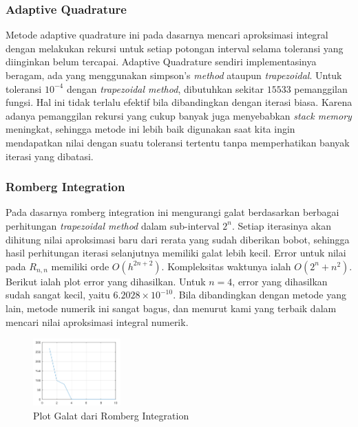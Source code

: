 \documentclass[11pt, a4paper, onecolumn, oneside, final]{report}
\begin{document}
\subsubsection*{Adaptive Quadrature}

Metode adaptive quadrature ini pada dasarnya mencari aproksimasi integral dengan melakukan rekursi untuk setiap potongan interval selama toleransi yang diinginkan belum tercapai. Adaptive Quadrature sendiri implementasinya beragam, ada yang menggunakan simpson's \textit{method} ataupun \textit{trapezoidal}. Untuk toleransi $10^{-4}$ dengan \textit{trapezoidal method}, dibutuhkan sekitar $15533$ pemanggilan fungsi. Hal ini tidak terlalu efektif bila dibandingkan dengan iterasi biasa. Karena adanya pemanggilan rekursi yang cukup banyak juga menyebabkan \textit{stack memory} meningkat, sehingga metode ini lebih baik digunakan saat kita ingin mendapatkan nilai dengan suatu toleransi tertentu tanpa memperhatikan banyak iterasi yang dibatasi.

\subsubsection*{Romberg Integration}

Pada dasarnya romberg integration ini mengurangi galat berdasarkan berbagai perhitungan \textit{trapezoidal method} dalam sub-interval $2^n$. Setiap iterasinya akan dihitung nilai aproksimasi baru dari rerata yang sudah diberikan bobot, sehingga hasil perhitungan iterasi selanjutnya memiliki galat lebih kecil. Error untuk nilai pada $R_{n, n}$ memiliki orde $O(h^{2n + 2})$. Kompleksitas waktunya ialah $O(2^n + n^2)$. Berikut ialah plot error yang dihasilkan. Untuk $n = 4$, error yang dihasilkan sudah sangat kecil, yaitu $6.2028 \times 10^{-10}$. Bila dibandingkan dengan metode yang lain, metode numerik ini sangat bagus, dan menurut kami yang terbaik dalam mencari nilai aproksimasi integral numerik.

\begin{figure}[h!]
    \centering
    \includegraphics[width=0.3\textwidth]{assets/RombergError.png}
    \caption{Plot Galat dari Romberg Integration}
\end{figure}
\end{document}
